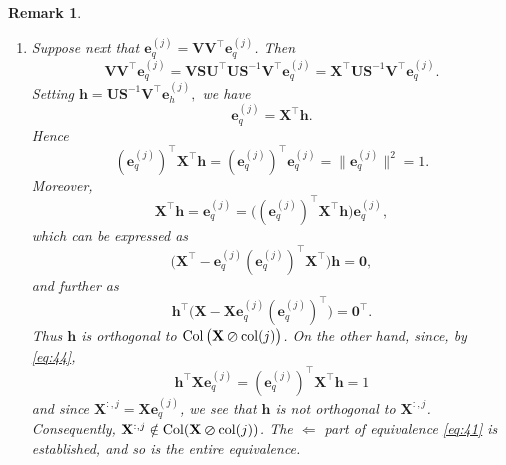 \documentclass[11pt,a4paper]{article}
\theoremstyle{break}
\numberwithin{dummy}{section}
\theoremstyle{plain}
\theoremstyle{plain}
\theoremstyle{plain}
\theoremstyle{plain}
\theoremstyle{plain}
\newtheorem{remark}{Remark}[section]
\theoremstyle{MyNonumberplain}
\DeclareMathOperator{\col}{Col}
\newcommand{\0}{\M{0}}
\newcommand{\M}[1]{\mathbf{#1}}
\newcommand{\T}{\top}
\newcommand{\ve}[1]{\mathbf{#1}}
\newcommand{\eve}[2]{\mathbf{e}^{(#1)}_{#2}}
\newcommand{\zercol}[2]{\M{#1} \varoslash \mathrm{col}(#2)}
\begin{document}
\begin{remark}
\begin{enumerate}[font=\upshape,label=(\roman*),wide,align=right]
\begin{align*}
    \end{align*}
    This establishes the $\Rightarrow$ part of equivalence \eqref{eq:41}.
  \item Suppose next that $\eve{j}{q} = \M{V} \M{V}^\T \eve{j}{q}$. Then
    \begin{displaymath}
      \M{V} \M{V}^\T \eve{j}{q}
      =
      \M{V} \M{S} \M{U}^\T \M{U} \M{S}^{-1} \M{V}^\T \eve{j}{q}
      =
      \M{X}^\T \M{U} \M{S}^{-1} \M{V}^\T \eve{j}{q}.
    \end{displaymath}
    Setting
    \begin{math}
      \ve{h} = \M{U} \M{S}^{-1} \M{V}^\T \eve{j}{h},
    \end{math}
    we have
    \begin{displaymath}
      \eve{j}{q} = \M{X}^\T \ve{h}.
    \end{displaymath}
    Hence
    \begin{equation}
      \label{eq:44}
      (\eve{j}{q})^\T \M{X}^\T \ve{h}
      =
      (\eve{j}{q})^\T \eve{j}{q}
      =
      \| \eve{j}{q} \|^2
      = 1.
    \end{equation}
    Moreover,
    \begin{displaymath}
      \M{X}^\T \ve{h}
      = \eve{j}{q}
      = \big((\eve{j}{q})^\T \M{X}^\T \ve{h} \big) \eve{j}{q},
    \end{displaymath}
    which can be expressed as
    \begin{displaymath}
      \big( \M{X}^\T -  \eve{j}{q} (\eve{j}{q})^\T \M{X}^\T \big) \ve{h} = \0,
    \end{displaymath}
    and further as
    \begin{displaymath}
      \ve{h}^\T \big(\M{X} - \M{X} \eve{j}{q} (\eve{j}{q})^\T \big) = \0^\T.
    \end{displaymath}
    Thus $\ve{h}$ is orthogonal to $\col \big( \zercol{X}{j} \big)$. On the other hand, since, by \eqref{eq:44},
    \begin{displaymath}
      \ve{h}^\T \M{X}\eve{j}{q}
      =
      (\eve{j}{q})^\T \M{X}^\T \ve{h}
      =
      1
    \end{displaymath}
    and since $\M{X}^{:,j} = \M{X}\eve{j}{q}$, we see that $\ve{h}$ is not orthogonal to $\M{X}^{:,j}$. Consequently, $\M{X}^{:,j} \notin \col (\zercol{X}{j})$. The $\Leftarrow$ part of equivalence \eqref{eq:41} is established, and so is the entire equivalence.
  \end{enumerate}
\end{remark}
\end{document}
